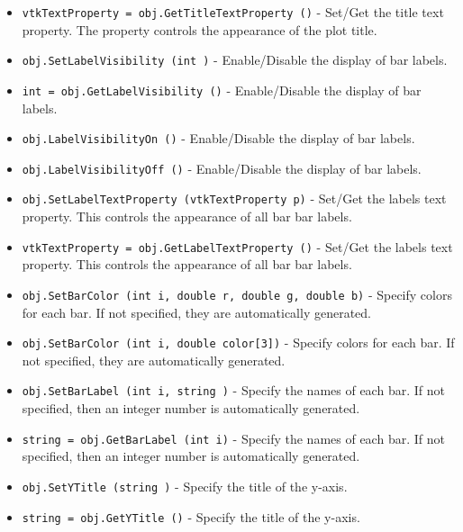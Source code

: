 \begin{itemize}
\item  \verb|vtkTextProperty = obj.GetTitleTextProperty ()| -  Set/Get the title text property. The property controls the
 appearance of the plot title.

\item  \verb|obj.SetLabelVisibility (int )| -  Enable/Disable the display of bar labels.

\item  \verb|int = obj.GetLabelVisibility ()| -  Enable/Disable the display of bar labels.

\item  \verb|obj.LabelVisibilityOn ()| -  Enable/Disable the display of bar labels.

\item  \verb|obj.LabelVisibilityOff ()| -  Enable/Disable the display of bar labels.

\item  \verb|obj.SetLabelTextProperty (vtkTextProperty p)| -  Set/Get the labels text property. This controls the appearance
 of all bar bar labels.

\item  \verb|vtkTextProperty = obj.GetLabelTextProperty ()| -  Set/Get the labels text property. This controls the appearance
 of all bar bar labels.

\item  \verb|obj.SetBarColor (int i, double r, double g, double b)| -  Specify colors for each bar. If not specified, they are 
 automatically generated.

\item  \verb|obj.SetBarColor (int i, double color[3])| -  Specify colors for each bar. If not specified, they are 
 automatically generated.

\item  \verb|obj.SetBarLabel (int i, string )| -  Specify the names of each bar. If
 not specified, then an integer number is automatically generated.

\item  \verb|string = obj.GetBarLabel (int i)| -  Specify the names of each bar. If
 not specified, then an integer number is automatically generated.

\item  \verb|obj.SetYTitle (string )| -  Specify the title of the y-axis.

\item  \verb|string = obj.GetYTitle ()| -  Specify the title of the y-axis.


\end{itemize}
